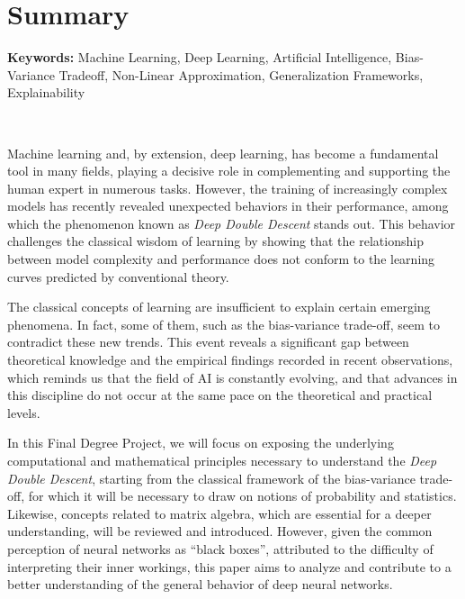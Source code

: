 %

\chapter{Summary}

\noindent\textbf{Keywords:} Machine Learning, Deep Learning, Artificial Intelligence, Bias-Variance Tradeoff, Non-Linear Approximation, Generalization Frameworks, Explainability

\

Machine learning and, by extension, deep learning, has become a fundamental tool in many fields, playing a decisive role in complementing and supporting the human expert in numerous tasks. However, the training of increasingly complex models has recently revealed unexpected behaviors in their performance, among which the phenomenon known as \emph{Deep Double Descent} stands out. This behavior challenges the classical wisdom of learning by showing that the relationship between model complexity and performance does not conform to the learning curves predicted by conventional theory.

The classical concepts of learning are insufficient to explain certain emerging phenomena. In fact, some of them, such as the bias-variance trade-off, seem to contradict these new trends. This event reveals a significant gap between theoretical knowledge and the empirical findings recorded in recent observations, which reminds us that the field of AI is constantly evolving, and that advances in this discipline do not occur at the same pace on the theoretical and practical levels.

In this Final Degree Project, we will focus on exposing the underlying computational and mathematical principles necessary to understand the \emph{Deep Double Descent}, starting from the classical framework of the bias-variance trade-off, for which it will be necessary to draw on notions of probability and statistics. Likewise, concepts related to matrix algebra, which are essential for a deeper understanding, will be reviewed and introduced. However, given the common perception of neural networks as “black boxes”, attributed to the difficulty of interpreting their inner workings, this paper aims to analyze and contribute to a better understanding of the general behavior of deep neural networks.

